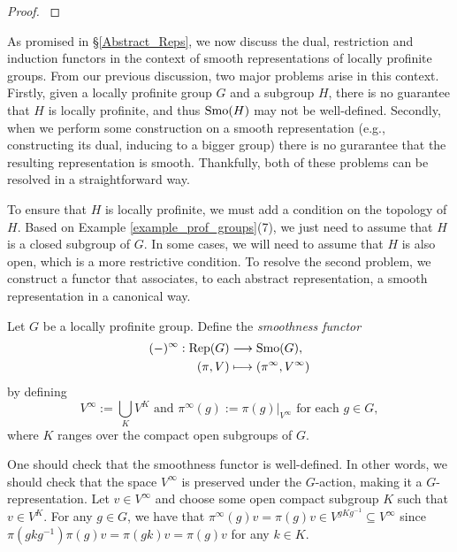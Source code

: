 \begin{proof}
    \cite[Proposition 2.3 and Corollary 1.2]{BH1}
\end{proof}

As promised in \S\ref{Abstract_Reps}, we now discuss the dual, restriction and induction functors in the context of smooth representations of locally profinite groups. From our previous discussion, two major problems arise in this context. Firstly, given a locally profinite group $G$ and a subgroup $H$, there is no guarantee that $H$ is locally profinite, and thus $\mathrm{Smo}(H)$ may not be well-defined. Secondly, when we perform some construction on a smooth representation (e.g., constructing its dual, inducing to a bigger group) there is no gurarantee that the resulting representation is smooth. Thankfully, both of these problems can be resolved in a straightforward way.

To ensure that $H$ is locally profinite, we must add a condition on the topology of $H$. Based on Example \ref{example_prof_groups}(7), we just need to assume that $H$ is a closed subgroup of $G$. In some cases, we will need to assume that $H$ is also open, which is a more restrictive condition. To resolve the second problem, we construct a functor that associates, to each abstract representation, a smooth representation in a canonical way.

\begin{defn}
    Let $G$ be a locally profinite group. Define the \textit{smoothness functor}
    \begin{align*}
        (-)^\infty:\mathrm{Rep}(G)&\longrightarrow\mathrm{Smo}(G),\\
        (\pi,V)&\longmapsto(\pi^\infty,V^\infty)
    \end{align*}
    by defining 
    $$V^\infty:=\bigcup_K V^K \text{  and  } \pi^\infty(g):=\pi(g)|_{V^\infty} \text{  for each  } g\in G,$$ where $K$ ranges over the compact open subgroups of $G$.
\end{defn}

\begin{rem}
    One should check that the smoothness functor is well-defined. In other words, we should check that the space $V^\infty$ is preserved under the $G$-action, making it a $G$-representation. Let $v\in V^\infty$ and choose some open compact subgroup $K$ such that $v\in V^K$. For any $g\in G$, we have that $\pi^\infty(g)v=\pi(g)v\in V^{gKg^{-1}}\subseteq V^\infty$ since $\pi(gkg^{-1})\pi(g)v=\pi(gk)v=\pi(g)v$ for any $k\in K$.
\end{rem}

